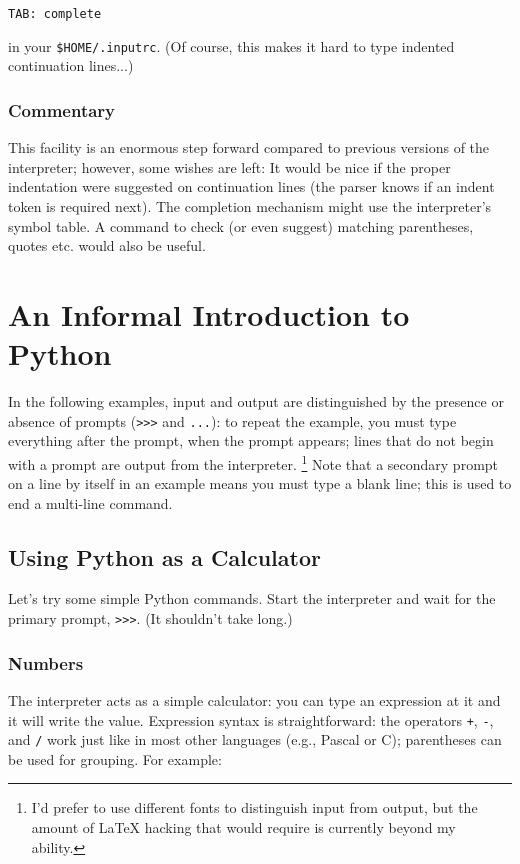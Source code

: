 \bcode\begin{verbatim}
TAB: complete
\end{verbatim}\ecode
%
in your {\tt \$HOME/.inputrc}.  (Of course, this makes it hard to type
indented continuation lines...)

\subsection{Commentary}

This facility is an enormous step forward compared to previous
versions of the interpreter; however, some wishes are left: It would
be nice if the proper indentation were suggested on continuation lines
(the parser knows if an indent token is required next).  The
completion mechanism might use the interpreter's symbol table.  A
command to check (or even suggest) matching parentheses, quotes etc.
would also be useful.


\chapter{An Informal Introduction to Python}

In the following examples, input and output are distinguished by the
presence or absence of prompts ({\tt >>>} and {\tt ...}): to repeat
the example, you must type everything after the prompt, when the
prompt appears; lines that do not begin with a prompt are output from
the interpreter.%
\footnote{
        I'd prefer to use different fonts to distinguish input
        from output, but the amount of LaTeX hacking that would require
        is currently beyond my ability.
}
Note that a secondary prompt on a line by itself in an example means
you must type a blank line; this is used to end a multi-line command.

\section{Using Python as a Calculator}

Let's try some simple Python commands.  Start the interpreter and wait
for the primary prompt, {\tt >>>}.  (It shouldn't take long.)

\subsection{Numbers}

The interpreter acts as a simple calculator: you can type an
expression at it and it will write the value.  Expression syntax is
straightforward: the operators {\tt +}, {\tt -}, {\tt *} and {\tt /}
work just like in most other languages (e.g., Pascal or C); parentheses
can be used for grouping.  For example:


